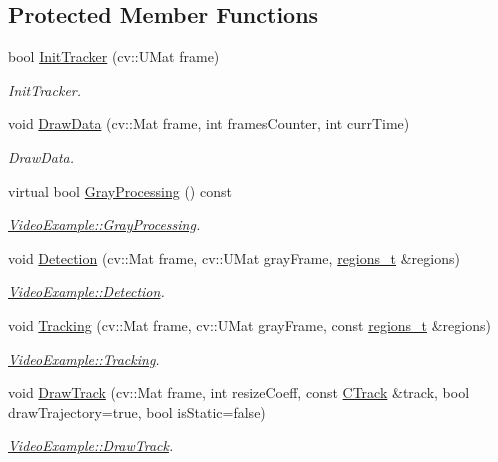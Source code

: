 \subsection*{Protected Member Functions}
\begin{DoxyCompactItemize}
\item 
bool \mbox{\hyperlink{class_motion_detector_example_ae814c565a7d6a9dbab9e8a99c790a77f}{Init\+Tracker}} (cv\+::\+U\+Mat frame)
\begin{DoxyCompactList}\small\item\em Init\+Tracker. \end{DoxyCompactList}\item 
void \mbox{\hyperlink{class_motion_detector_example_ad4036841b235fd67dfa45b1fc376e09c}{Draw\+Data}} (cv\+::\+Mat frame, int frames\+Counter, int curr\+Time)
\begin{DoxyCompactList}\small\item\em Draw\+Data. \end{DoxyCompactList}\item 
virtual bool \mbox{\hyperlink{class_video_example_af8ea44f17711129d2b954d1f01fee1f0}{Gray\+Processing}} () const
\begin{DoxyCompactList}\small\item\em \mbox{\hyperlink{class_video_example_af8ea44f17711129d2b954d1f01fee1f0}{Video\+Example\+::\+Gray\+Processing}}. \end{DoxyCompactList}\item 
void \mbox{\hyperlink{class_video_example_a5ea4a212997371399b01aed1d59a80b8}{Detection}} (cv\+::\+Mat frame, cv\+::\+U\+Mat gray\+Frame, \mbox{\hyperlink{defines_8h_a01db0de56a20f4342820a093c5154536}{regions\+\_\+t}} \&regions)
\begin{DoxyCompactList}\small\item\em \mbox{\hyperlink{class_video_example_a5ea4a212997371399b01aed1d59a80b8}{Video\+Example\+::\+Detection}}. \end{DoxyCompactList}\item 
void \mbox{\hyperlink{class_video_example_af412482dcaad532d958dc31b362ee1c2}{Tracking}} (cv\+::\+Mat frame, cv\+::\+U\+Mat gray\+Frame, const \mbox{\hyperlink{defines_8h_a01db0de56a20f4342820a093c5154536}{regions\+\_\+t}} \&regions)
\begin{DoxyCompactList}\small\item\em \mbox{\hyperlink{class_video_example_af412482dcaad532d958dc31b362ee1c2}{Video\+Example\+::\+Tracking}}. \end{DoxyCompactList}\item 
void \mbox{\hyperlink{class_video_example_a84a040bc87b915c5ee18c5d11235f40c}{Draw\+Track}} (cv\+::\+Mat frame, int resize\+Coeff, const \mbox{\hyperlink{class_c_track}{C\+Track}} \&track, bool draw\+Trajectory=true, bool is\+Static=false)
\begin{DoxyCompactList}\small\item\em \mbox{\hyperlink{class_video_example_a84a040bc87b915c5ee18c5d11235f40c}{Video\+Example\+::\+Draw\+Track}}. \end{DoxyCompactList}\end{DoxyCompactItemize}
